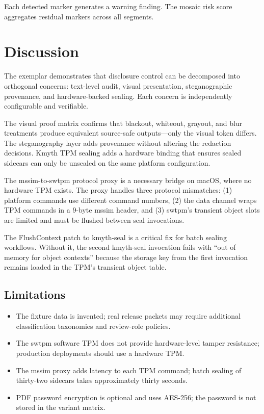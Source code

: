 \documentclass[
]{article}
\providecommand{\tightlist}{%
  \setlength{\itemsep}{0pt}\setlength{\parskip}{0pt}}
\begin{document}
Each detected marker generates a warning finding. The mosaic risk score
aggregates residual markers across all segments.

\section{Discussion}\label{discussion}

The exemplar demonstrates that disclosure control can be decomposed into
orthogonal concerns: text-level audit, visual presentation,
steganographic provenance, and hardware-backed sealing. Each concern is
independently configurable and verifiable.

The visual proof matrix confirms that blackout, whiteout, grayout, and
blur treatments produce equivalent source-safe outputs---only the visual
token differs. The steganography layer adds provenance without altering
the redaction decisions. Kmyth TPM sealing adds a hardware binding that
ensures sealed sidecars can only be unsealed on the same platform
configuration.

The mssim-to-swtpm protocol proxy is a necessary bridge on macOS, where
no hardware TPM exists. The proxy handles three protocol mismatches: (1)
platform commands use different command numbers, (2) the data channel
wraps TPM commands in a 9-byte mssim header, and (3) swtpm's transient
object slots are limited and must be flushed between seal invocations.

The FlushContext patch to kmyth-seal is a critical fix for batch sealing
workflows. Without it, the second kmyth-seal invocation fails with ``out
of memory for object contexts'' because the storage key from the first
invocation remains loaded in the TPM's transient object table.

\subsection{Limitations}\label{limitations}

\begin{itemize}
\tightlist
\item
  The fixture data is invented; real release packets may require
  additional classification taxonomies and review-role policies.
\item
  The swtpm software TPM does not provide hardware-level tamper
  resistance; production deployments should use a hardware TPM.
\item
  The mssim proxy adds latency to each TPM command; batch sealing of
  thirty-two sidecars takes approximately thirty seconds.
\item
  PDF password encryption is optional and uses AES-256; the password is
  not stored in the variant matrix.
\end{itemize}



\clearpage


\end{document}
